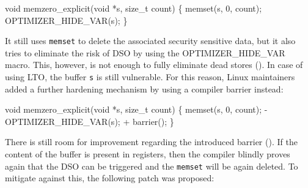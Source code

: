 \documentclass[
  a4paper,
]{report}
\newenvironment{Shaded}{}{}
\newcommand{\DataTypeTok}[1]{\textcolor[rgb]{0.56,0.13,0.00}{#1}}
\newcommand{\DecValTok}[1]{\textcolor[rgb]{0.25,0.63,0.44}{#1}}
\newcommand{\NormalTok}[1]{#1}
\newcommand{\OperatorTok}[1]{\textcolor[rgb]{0.40,0.40,0.40}{#1}}
\begin{document}
\begin{Shaded}
\begin{Highlighting}[]
\DataTypeTok{void}\NormalTok{ memzero\_explicit}\OperatorTok{(}\DataTypeTok{void} \OperatorTok{*}\NormalTok{s}\OperatorTok{,} \DataTypeTok{size\_t}\NormalTok{ count}\OperatorTok{)}
\OperatorTok{\{}
\NormalTok{  memset}\OperatorTok{(}\NormalTok{s}\OperatorTok{,} \DecValTok{0}\OperatorTok{,}\NormalTok{ count}\OperatorTok{);}
\NormalTok{  OPTIMIZER\_HIDE\_VAR}\OperatorTok{(}\NormalTok{s}\OperatorTok{);}
\OperatorTok{\}}
\end{Highlighting}
\end{Shaded}

It still uses \texttt{memset}  to delete the associated
security sensitive data, but it also tries to eliminate the risk of DSO
by using the OPTIMIZER\_HIDE\_VAR macro. This, however, is not enough to
fully eliminate dead stores (). In case of using LTO, the buffer \texttt{s} is still vulnerable.
For this reason, Linux maintainers added a further hardening mechanism
by using a compiler barrier instead:

\begin{Shaded}
\begin{Highlighting}[]
\DataTypeTok{void}\NormalTok{ memzero\_explicit}\OperatorTok{(}\DataTypeTok{void} \OperatorTok{*}\NormalTok{s}\OperatorTok{,} \DataTypeTok{size\_t}\NormalTok{ count}\OperatorTok{)}
\OperatorTok{\{}
\NormalTok{  memset}\OperatorTok{(}\NormalTok{s}\OperatorTok{,} \DecValTok{0}\OperatorTok{,}\NormalTok{ count}\OperatorTok{);}
  \OperatorTok{{-}}\NormalTok{ OPTIMIZER\_HIDE\_VAR}\OperatorTok{(}\NormalTok{s}\OperatorTok{);}
  \OperatorTok{+}\NormalTok{ barrier}\OperatorTok{();}
\OperatorTok{\}}
\end{Highlighting}
\end{Shaded}

There is still room for improvement regarding the introduced barrier
(). If the content of the
buffer is present in registers, then the compiler blindly proves again
that the DSO can be triggered and the \texttt{memset} will be again
deleted. To mitigate against this, the following patch was proposed:
\end{document}
